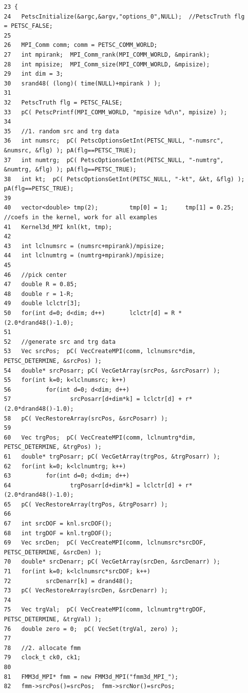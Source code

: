 \footnotesize\begin{verbatim}23 {
24   PetscInitialize(&argc,&argv,"options_0",NULL);  //PetscTruth flg = PETSC_FALSE;
25 
26   MPI_Comm comm; comm = PETSC_COMM_WORLD;
27   int mpirank;  MPI_Comm_rank(MPI_COMM_WORLD, &mpirank);
28   int mpisize;  MPI_Comm_size(MPI_COMM_WORLD, &mpisize);
29   int dim = 3;
30   srand48( (long)( time(NULL)+mpirank ) );
31   
32   PetscTruth flg = PETSC_FALSE;
33   pC( PetscPrintf(MPI_COMM_WORLD, "mpisize %d\n", mpisize) );
34   
35   //1. random src and trg data
36   int numsrc;  pC( PetscOptionsGetInt(PETSC_NULL, "-numsrc", &numsrc, &flg) ); pA(flg==PETSC_TRUE);
37   int numtrg;  pC( PetscOptionsGetInt(PETSC_NULL, "-numtrg", &numtrg, &flg) ); pA(flg==PETSC_TRUE);
38   int kt;  pC( PetscOptionsGetInt(PETSC_NULL, "-kt", &kt, &flg) ); pA(flg==PETSC_TRUE);
39   
40   vector<double> tmp(2);         tmp[0] = 1;     tmp[1] = 0.25; //coefs in the kernel, work for all examples
41   Kernel3d_MPI knl(kt, tmp);
42   
43   int lclnumsrc = (numsrc+mpirank)/mpisize;
44   int lclnumtrg = (numtrg+mpirank)/mpisize;
45   
46   //pick center
47   double R = 0.85;
48   double r = 1-R;
49   double lclctr[3];
50   for(int d=0; d<dim; d++)       lclctr[d] = R * (2.0*drand48()-1.0);
51   
52   //generate src and trg data
53   Vec srcPos;  pC( VecCreateMPI(comm, lclnumsrc*dim, PETSC_DETERMINE, &srcPos) );
54   double* srcPosarr; pC( VecGetArray(srcPos, &srcPosarr) );
55   for(int k=0; k<lclnumsrc; k++)
56          for(int d=0; d<dim; d++)
57                 srcPosarr[d+dim*k] = lclctr[d] + r*(2.0*drand48()-1.0);
58   pC( VecRestoreArray(srcPos, &srcPosarr) );
59   
60   Vec trgPos;  pC( VecCreateMPI(comm, lclnumtrg*dim, PETSC_DETERMINE, &trgPos) );
61   double* trgPosarr; pC( VecGetArray(trgPos, &trgPosarr) );
62   for(int k=0; k<lclnumtrg; k++)
63          for(int d=0; d<dim; d++)
64                 trgPosarr[d+dim*k] = lclctr[d] + r*(2.0*drand48()-1.0);
65   pC( VecRestoreArray(trgPos, &trgPosarr) );
66   
67   int srcDOF = knl.srcDOF();
68   int trgDOF = knl.trgDOF();
69   Vec srcDen;  pC( VecCreateMPI(comm, lclnumsrc*srcDOF, PETSC_DETERMINE, &srcDen) );
70   double* srcDenarr; pC( VecGetArray(srcDen, &srcDenarr) );
71   for(int k=0; k<lclnumsrc*srcDOF; k++)
72          srcDenarr[k] = drand48();
73   pC( VecRestoreArray(srcDen, &srcDenarr) );
74   
75   Vec trgVal;  pC( VecCreateMPI(comm, lclnumtrg*trgDOF, PETSC_DETERMINE, &trgVal) );
76   double zero = 0;  pC( VecSet(trgVal, zero) );
77   
78   //2. allocate fmm 
79   clock_t ck0, ck1;
80   
81   FMM3d_MPI* fmm = new FMM3d_MPI("fmm3d_MPI_");
82   fmm->srcPos()=srcPos;  fmm->srcNor()=srcPos;

\end{verbatim}

